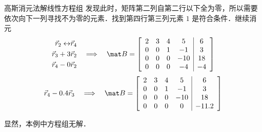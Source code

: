 \begin{exam}{高斯消元法解线性方程组}
发现此时，矩阵第二列自第二行以下全为零，所以需要依次向下一列寻找不为零的元素．找到第四行第三列元素 $1$ 是符合条件．继续消元
\begin{equation}
\begin{aligned}
\vec r_2 \leftrightarrow &\vec r_4 \\
\vec r_3 + 3 &\vec r_2 \\
\vec r_4 - 0 &\vec r_2 \\
\end{aligned}
\quad \Longrightarrow \quad
\mat B={
	\left[ \begin{array}{cccc|c}
	2 &3 &4  &5   &6  \\
	0 &0 &1  &-1  &3  \\
	0 &0 &0  &-10 &18 \\
	0 &0 &0  &-4 &-4  \\
	\end{array} 
	\right ]}
\end{equation}
\begin{equation}
\vec r_4 - 0.4 \vec r_3
\quad \Longrightarrow \quad
\mat B={
	\left[ \begin{array}{cccc|c}
	2 &3 &4  &5   &6  \\
	0 &0 &1  &-1  &3  \\
	0 &0 &0  &-10 &18 \\
	0 &0 &0  &0   &-11.2  \\
	\end{array} 
	\right ]}
\end{equation}

显然，本例中方程组无解．
\end{exam}




